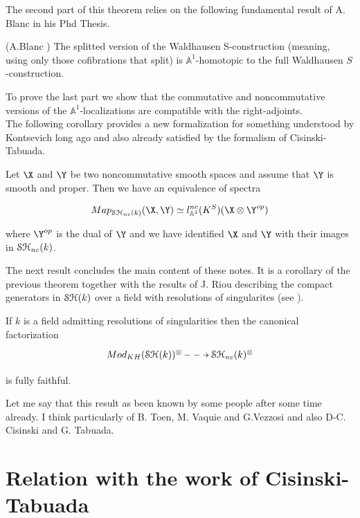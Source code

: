 \begin{refsection}
The second part of this theorem relies on the following fundamental result of A. Blanc in his Phd Thesis.

\begin{prop}(A.Blanc \cite[Prop. 4.6]{Anthony-thesis})
The splitted version of the Waldhausen S-construction (meaning, using only those cofibrations that split) is $\mathbb{A}^1$-homotopic to the full Waldhausen $S$-construction.
\end{prop}

To prove the last part we show that the commutative and noncommutative versions of the $\mathbb{A}^1$-localizations are compatible with the right-adjoints.\\


The following corollary provides a new formalization for something understood by Kontsevich \cite{kontsevich1, kontsevich2} long ago and also already satisfied by the formalism of Cisinski-Tabuada.

\begin{cor}
Let $\X$ and $\Y$ be two noncommutative smooth spaces and assume that $\Y$ is smooth and proper. Then we have an equivalence of spectra

$$
Map_{\stnck}(\X, \Y)\simeq l_{\mathbb{A}^1}^{nc}(K^S)(\X\otimes \Y^{op})
$$

\noindent where $\Y^{op}$ is the dual of $\Y$ and we have identified $\X$ and $\Y$ with their images in $\mathcal{S}\mathcal{H}_{nc}(k)$.
\end{cor}


The next result concludes the main content of these notes. It is a corollary of the previous theorem together with the results of J. Riou describing the compact generators in $\mathcal{S}\mathcal{H}(k)$ over a field with resolutions of singularites (see \cite{Riou-SHcompact}).




\begin{cor}
If $k$ is a field admitting resolutions of singularities then the canonical factorization 
$$\xymatrix{Mod_{KH}(\stk)^{\otimes}\ar@{-->}[r]& \stncmonoidalk}$$

 \noindent is fully faithful.
\end{cor}

Let me say that this result as been known by some people after some time already. I think particularly of B. Toen, M. Vaquie and G.Vezzosi and also D-C. Cisinski and G. Tabuada.

\section{Relation with the work of Cisinski-Tabuada}


\end{refsection}
